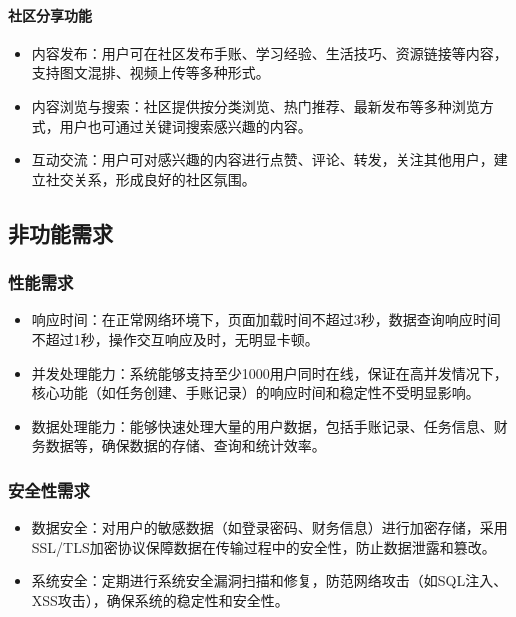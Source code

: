 \documentclass[a4paper]{article}
\begin{document}
\paragraph{社区分享功能}

\begin{itemize}
    \item 内容发布：用户可在社区发布手账、学习经验、生活技巧、资源链接等内容，支持图文混排、视频上传等多种形式。
    \item 内容浏览与搜索：社区提供按分类浏览、热门推荐、最新发布等多种浏览方式，用户也可通过关键词搜索感兴趣的内容。
    \item 互动交流：用户可对感兴趣的内容进行点赞、评论、转发，关注其他用户，建立社交关系，形成良好的社区氛围。
\end{itemize}

\subsection{非功能需求}

\subsubsection{性能需求}

\begin{itemize}
    \item 响应时间：在正常网络环境下，页面加载时间不超过3秒，数据查询响应时间不超过1秒，操作交互响应及时，无明显卡顿。
    \item 并发处理能力：系统能够支持至少1000用户同时在线，保证在高并发情况下，核心功能（如任务创建、手账记录）的响应时间和稳定性不受明显影响。
    \item 数据处理能力：能够快速处理大量的用户数据，包括手账记录、任务信息、财务数据等，确保数据的存储、查询和统计效率。
\end{itemize}

\subsubsection{安全性需求}

\begin{itemize}
    \item 数据安全：对用户的敏感数据（如登录密码、财务信息）进行加密存储，采用SSL/TLS加密协议保障数据在传输过程中的安全性，防止数据泄露和篡改。
    \item 系统安全：定期进行系统安全漏洞扫描和修复，防范网络攻击（如SQL注入、XSS攻击），确保系统的稳定性和安全性。
\end{itemize}
\end{document}
